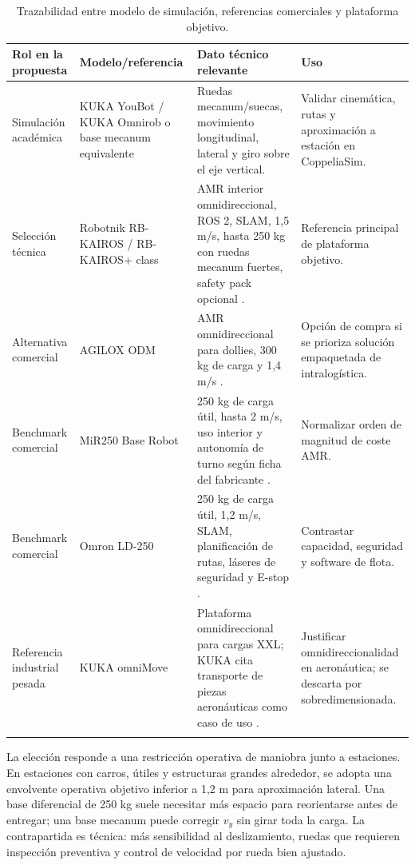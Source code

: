 \begin{longtable}{P{0.18\textwidth}P{0.25\textwidth}P{0.31\textwidth}P{0.16\textwidth}}
\toprule
Rol en la propuesta & Modelo/referencia & Dato técnico relevante & Uso\\
\midrule
\endhead
Simulación académica & KUKA YouBot / KUKA Omnirob o base mecanum equivalente & Ruedas mecanum/suecas, movimiento longitudinal, lateral y giro sobre el eje vertical. & Validar cinemática, rutas y aproximación a estación en CoppeliaSim.\\
Selección técnica & Robotnik RB-KAIROS / RB-KAIROS+ class & AMR interior omnidireccional, ROS 2, SLAM, 1,5 m/s, hasta 250 kg con ruedas mecanum fuertes, safety pack opcional \cite{robotnikRbKairosDatasheet}. & Referencia principal de plataforma objetivo.\\
Alternativa comercial & AGILOX ODM & AMR omnidireccional para dollies, 300 kg de carga y 1,4 m/s \cite{agiloxOdm}. & Opción de compra si se prioriza solución empaquetada de intralogística.\\
Benchmark comercial & MiR250 Base Robot & 250 kg de carga útil, hasta 2 m/s, uso interior y autonomía de turno según ficha del fabricante \cite{mir250Specs}. & Normalizar orden de magnitud de coste AMR.\\
Benchmark comercial & Omron LD-250 & 250 kg de carga útil, 1,2 m/s, SLAM, planificación de rutas, láseres de seguridad y E-stop \cite{omronLd250}. & Contrastar capacidad, seguridad y software de flota.\\
Referencia industrial pesada & KUKA omniMove & Plataforma omnidireccional para cargas XXL; KUKA cita transporte de piezas aeronáuticas como caso de uso \cite{kukaOmniMove}. & Justificar omnidireccionalidad en aeronáutica; se descarta por sobredimensionada.\\
\bottomrule
\caption{Trazabilidad entre modelo de simulación, referencias comerciales y plataforma objetivo.}
\label{tab:modelos-robot}
\end{longtable}

La elección responde a una restricción operativa de maniobra junto a estaciones. En estaciones con carros, útiles y estructuras grandes alrededor, se adopta una envolvente operativa objetivo inferior a 1,2 m para aproximación lateral. Una base diferencial de 250 kg suele necesitar más espacio para reorientarse antes de entregar; una base mecanum puede corregir \(v_y\) sin girar toda la carga. La contrapartida es técnica: más sensibilidad al deslizamiento, ruedas que requieren inspección preventiva y control de velocidad por rueda bien ajustado.

